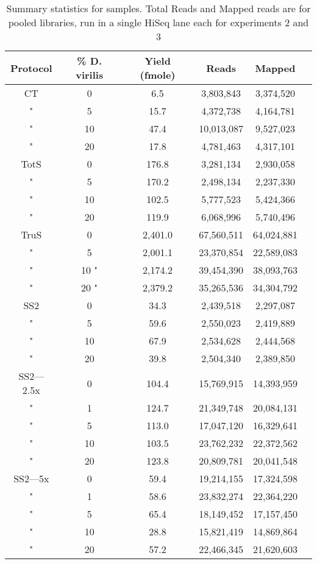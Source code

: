 \begin{table}[htdp]
\begin{center}
\begin{tabular}{|c|c|c|c|c|c|} \hline
Protocol & \%  D. virilis  &  Yield (fmole) & Reads & Mapped \\\hline 
CT & 0  & 6.5  & 3,803,843 &3,374,520 \\
" &  5 & 15.7  & 4,372,738 &4,164,781 \\
" & 10 & 47.4  & 10,013,087 &9,527,023 \\
" & 20 & 17.8  & 4,781,463 &4,317,101 \\
TotS & 0  & 176.8  & 3,281,134 &2,930,058 \\
" &  5  & 170.2  & 2,498,134 &2,237,330 \\
" & 10  & 102.5  & 5,777,523 &5,424,366 \\
" & 20  & 119.9  & 6,068,996 &5,740,496 \\
TruS & 0  & 2,401.0  & 67,560,511 &64,024,881 \\
" &  5  & 2,001.1  & 23,370,854 &22,589,083 \\
" & 10 " & 2,174.2  & 39,454,390 &38,093,763 \\
" & 20 " & 2,379.2  & 35,265,536 &34,304,792 \\
SS2 & 0 & 34.3  & 2,439,518 &2,297,087 \\
" &  5 & 59.6  & 2,550,023 &2,419,889 \\
" & 10 & 67.9  & 2,534,628 &2,444,568 \\
" & 20 & 39.8  & 2,504,340 &2,389,850 \\
SS2---2.5x & 0 & 104.4  & 15,769,915 &14,393,959 \\
" &  1 & 124.7  & 21,349,748 &20,084,131 \\
" &  5 & 113.0  & 17,047,120 &16,329,641 \\
" & 10 & 103.5  & 23,762,232 &22,372,562 \\
" & 20 & 123.8  & 20,809,781 &20,041,548 \\
SS2---5x & 0 & 59.4  & 19,214,155 &17,324,598 \\
" &  1 & 58.6  & 23,832,274 &22,364,220 \\
" &  5 & 65.4  & 18,149,452 &17,157,450 \\
" & 10 & 28.8  & 15,821,419 &14,869,864 \\
" & 20 & 57.2  & 22,466,345 &21,620,603 \\
\hline
\end{tabular}
\label{tab:protocols}
\caption{Summary statistics for samples.  Total Reads
     and Mapped reads are for pooled libraries, run in a single HiSeq lane each
     for experiments 2 and 3}
\end{center}
\end{table}
      
